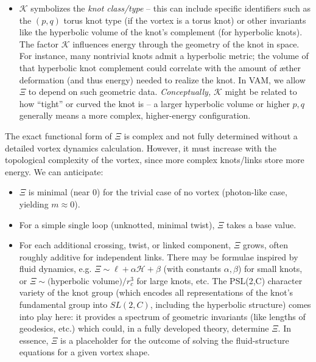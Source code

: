 \begin{itemize}
\begin{itemize}
\item
$\mathcal{K}$ symbolizes the \textit{knot class/type} – this can include specific identifiers such as the $(p,q)$ torus knot type (if the vortex is a torus knot) or other invariants like the hyperbolic volume of the knot’s complement (for hyperbolic knots). The factor $\mathcal{K}$ influences energy through the geometry of the knot in space. For instance, many nontrivial knots admit a hyperbolic metric; the volume of that hyperbolic knot complement could correlate with the amount of æther deformation (and thus energy) needed to realize the knot. In VAM, we allow $\Xi$ to depend on such geometric data. \textit{Conceptually,} $\mathcal{K}$ might be related to how “tight” or curved the knot is – a larger hyperbolic volume or higher $p,q$ generally means a more complex, higher-energy configuration.

\end{itemize}
\end{itemize}

The exact functional form of $\Xi$ is complex and not fully determined without a detailed vortex dynamics calculation. However, it must increase with the topological complexity of the vortex, since more complex knots/links store more energy. We can anticipate:\begin{itemize}

\item
$\Xi$ is minimal (near 0) for the trivial case of no vortex (photon-like case, yielding $m\approx0$).

\item
For a simple single loop (unknotted, minimal twist), $\Xi$ takes a base value.

\item
For each additional crossing, twist, or linked component, $\Xi$ grows, often roughly additive for independent links. There may be formulae inspired by fluid dynamics, e.g. $\Xi \sim \ell + \alpha \mathcal{H} + \beta$ (with constants $\alpha,\beta$) for small knots, or $\Xi \sim \text{(hyperbolic volume)} / r_c^3$ for large knots, etc. The PSL(2,C) character variety of the knot group (which encodes all representations of the knot’s fundamental group into $SL(2,C)$, including the hyperbolic structure) comes into play here: it provides a spectrum of geometric invariants (like lengths of geodesics, etc.) which could, in a fully developed theory, determine $\Xi$. In essence, $\Xi$ is a placeholder for the outcome of solving the fluid-structure equations for a given vortex shape.

\end{itemize}


